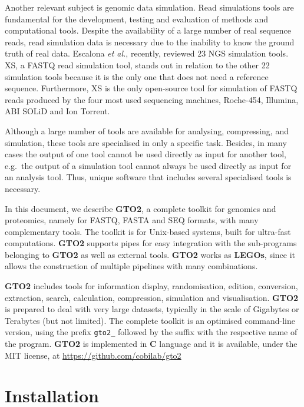 \documentclass[11pt,]{krantz}
\begin{document}
Another relevant subject is genomic data simulation. Read simulations tools are fundamental for the development, testing and evaluation of methods and computational tools\citep[price2017simulome]{huang2011art}. Despite the availability of a large number of real sequence reads, read simulation data is necessary due to the inability to know the ground truth of real data\citep{baruzzo2017simulation}. Escalona \textit{et al.}\citep{escalona2016comparison}, recently, reviewed 23 NGS simulation tools. XS\citep{pratas2014xs}, a FASTQ read simulation tool, stands out in relation to the other 22 simulation tools because it is the only one that does not need a reference sequence. Furthermore, XS is the only open-source tool for simulation of FASTQ reads produced by the four most used sequencing machines, Roche-454, Illumina, ABI SOLiD and Ion Torrent.

Although a large number of tools are available for analysing, compressing, and simulation, these tools are specialised in only a specific task. Besides, in many cases the output of one tool cannot be used directly as input for another tool, e.g.~the output of a simulation tool cannot always be used directly as input for an analysis tool. Thus, unique software that includes several specialised tools is necessary.

In this document, we describe \textbf{GTO2}, a complete toolkit for genomics and proteomics, namely for FASTQ, FASTA and SEQ formats, with many complementary tools. The toolkit is for Unix-based systems, built for ultra-fast computations. \textbf{GTO2} supports pipes for easy integration with the sub-programs belonging to \textbf{GTO2} as well as external tools. \textbf{GTO2} works as \textbf{LEGOs}, since it allows the construction of multiple pipelines with many combinations.

\textbf{GTO2} includes tools for information display, randomisation, edition, conversion, extraction, search, calculation, compression, simulation and visualisation. \textbf{GTO2} is prepared to deal with very large datasets, typically in the scale of Gigabytes or Terabytes (but not limited). The complete toolkit is an optimised command-line version, using the prefix \texttt{gto2\_} followed by the suffix with the respective name of the program. \textbf{GTO2} is implemented in \textbf{C} language and it is available, under the MIT license, at \url{https://github.com/cobilab/gto2}

\section{Installation}\label{installation}
\end{document}
